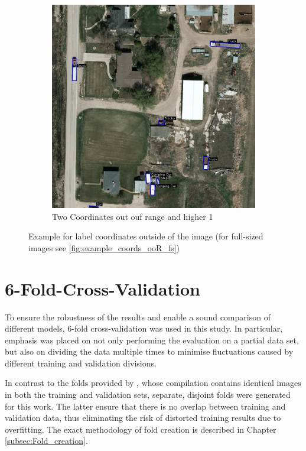 \begin{figure}[h]
\begin{subfigure}[b]{0.45\textwidth}
        \includegraphics[trim={180pt 0pt 750pt 993pt},clip,width=\textwidth]{images/bb_higher1.png}
        \caption{Two Coordinates out ouf range and higher 1}
        \label{fig:higher1}
    \end{subfigure}
    \caption[Example for label coordinates outside of the image]{Example for label coordinates outside of the image (for full-sized images see \ref{fig:example_coords_ooR_fs})}
    \label{fig:example_coords_ooR}
\end{figure}







\section{6-Fold-Cross-Validation}
\label{sec_5Fold_CV}


To ensure the robustness of the results and enable a sound comparison of different models, 6-fold cross-validation was used in this study. In particular, emphasis was placed on not only performing the evaluation on a partial data set, but also on dividing the data multiple times to minimise fluctuations caused by different training and validation divisions.

In contrast to the folds provided by \citeauthor{Razakarivony2015} \cite{Razakarivony2015}, whose compilation contains identical images in both the training and validation sets, separate, disjoint folds were generated for this work. The latter ensure that there is no overlap between training and validation data, thus eliminating the risk of distorted training results due to overfitting. The exact methodology of fold creation is described in Chapter \ref{subsec:Fold_creation}.

